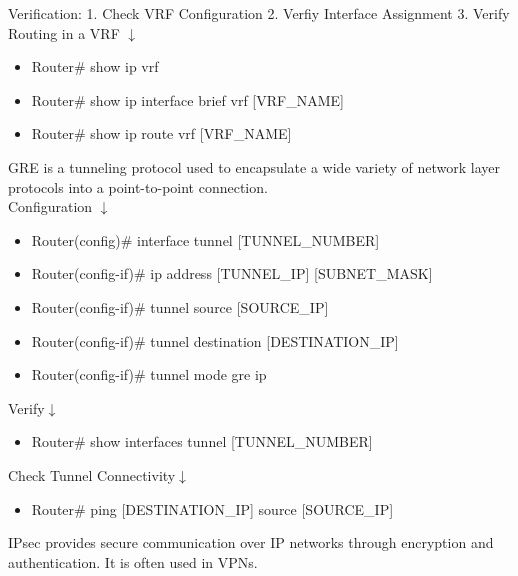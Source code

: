 \documentclass{article}
\begin{document}
Verification: 1. Check VRF Configuration  2. Verfiy Interface Assignment 3. Verify Routing in a VRF $\downarrow$
\begin{itemize}
\item Router\# show ip vrf
\item Router\# show ip interface brief vrf [VRF\_NAME]
\item Router\# show ip route vrf [VRF\_NAME]
\end{itemize}

	GRE is a tunneling protocol used to encapsulate a wide variety of network layer protocols into a point-to-point connection.\\

Configuration $\downarrow$
\begin{itemize}
\item Router(config)\# interface tunnel [TUNNEL\_NUMBER]
\item Router(config-if)\# ip address [TUNNEL\_IP] [SUBNET\_MASK]
\item Router(config-if)\# tunnel source [SOURCE\_IP]
\item Router(config-if)\# tunnel destination [DESTINATION\_IP]
\item Router(config-if)\# tunnel mode gre ip
\end{itemize}

Verify$\downarrow$
\begin{itemize}
\item Router\# show interfaces tunnel [TUNNEL\_NUMBER]
\end{itemize}

Check Tunnel Connectivity$\downarrow$
\begin{itemize}
\item Router\# ping [DESTINATION\_IP] source [SOURCE\_IP]
\end{itemize}

	IPsec provides secure communication over IP networks through encryption and authentication. It is often used in VPNs.\\
\end{document}
